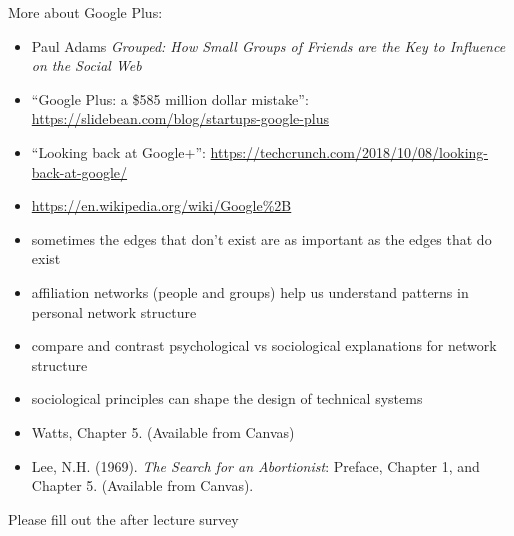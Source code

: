 \documentclass{beamer}
\begin{document}
\begin{frame}

More about Google Plus:
\begin{itemize}
\item Paul Adams \textit{Grouped: How Small Groups of Friends are the Key to Influence on the Social Web}
\item ``Google Plus: a \$585 million dollar mistake'': \url{https://slidebean.com/blog/startups-google-plus}
\item ``Looking back at Google+'': \url{https://techcrunch.com/2018/10/08/looking-back-at-google/}
\item \url{https://en.wikipedia.org/wiki/Google\%2B}
\end{itemize}

\end{frame}
\begin{frame}

\begin{itemize}
\item sometimes the edges that don't exist are as important as the edges that do exist
\pause
\item affiliation networks (people and groups) help us understand patterns in personal network structure
\pause
\item compare and contrast psychological vs sociological explanations for network structure 
\pause
\item sociological principles can shape the design of technical systems
\end{itemize}

\end{frame}
\begin{frame}

\begin{itemize}
\item Watts, Chapter 5. (Available from Canvas)
\item Lee, N.H. (1969). \textit{The Search for an Abortionist}: Preface, Chapter 1, and Chapter 5. (Available from Canvas). 
\end{itemize}


\end{frame}
\begin{frame}

Please fill out the after lecture survey

\end{frame}
\end{document}
